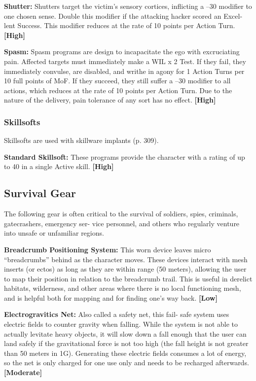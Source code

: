 \textbf{Shutter:} Shutters target the victim's sensory cortices, 
inflicting a –30 modifier to one chosen sense. Double 
this modifier if the attacking hacker scored an Excel-
lent Success. This modifier reduces at the rate of 10 
points per Action Turn. \textbf{[High]}

\textbf{Spasm:} Spasm programs are design to incapacitate 
the ego with excruciating pain. Affected targets must 
immediately make a WIL x 2 Test. If they fail, they 
immediately convulse, are disabled, and writhe in 
agony for 1 Action Turns per 10 full points of MoF. 
If they succeed, they still suffer a –30 modifier to all 
actions, which reduces at the rate of 10 points per 
Action Turn. Due to the nature of the delivery, pain 
tolerance of any sort has no effect. \textbf{[High]}

\subsubsection{Skillsofts}

Skillsofts are used with skillware implants (p. 309).

\textbf{Standard Skillsoft:} These programs provide the 
character with a rating of up to 40 in a single Active 
skill. \textbf{[High]}

\subsection{Survival Gear}

The following gear is often critical to the survival of 
soldiers, spies, criminals, gatecrashers, emergency ser-
vice personnel, and others who regularly venture into 
unsafe or unfamiliar regions.

\textbf{Breadcrumb Positioning System: }This worn device 
leaves micro ``breadcrumbs'' behind as the character 
moves. These devices interact with mesh inserts (or 
ectos) as long as they are within range (50 meters), 
allowing the user to map their position in relation to 
the breadcrumb trail. This is useful in derelict habitats, 
wilderness, and other areas where there is no local 
functioning mesh, and is helpful both for mapping 
and for finding one's way back. \textbf{[Low]}

\textbf{Electrogravitics Net:} Also called a safety net, this fail-
safe system uses electric fields to counter gravity when 
falling. While the system is not able to actually levitate 
heavy objects, it will slow down a fall enough that the 
user can land safely if the gravitational force is not too 
high (the fall height is not greater than 50 meters in 
1G). Generating these electric fields consumes a lot of 
energy, so the net is only charged for one use only and 
needs to be recharged afterwards. \textbf{[Moderate]}

